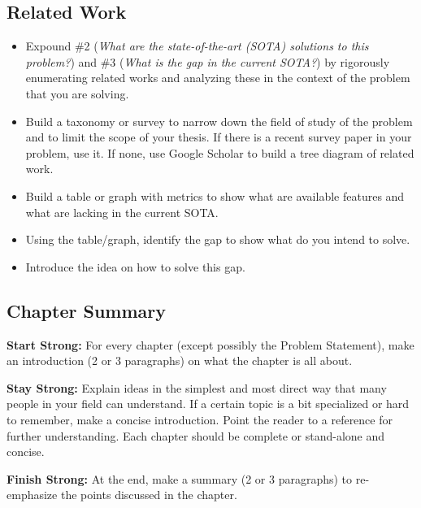 \begin{singlespace}
    \chapter{Related Work}
    \label{ch:related-work}
\end{singlespace}

\begin{itemize}
    \item Expound \#2 (\emph{What are the state-of-the-art (SOTA) solutions to this problem?}) and \#3 (\emph{What is the gap in the current SOTA?}) by rigorously enumerating related works and analyzing these in the context of the problem that you are solving.
    \item Build a taxonomy or survey to narrow down the field of study of the problem and to limit the scope of your thesis. If there is a recent survey paper in your problem, use it. If none, use Google Scholar to build a tree diagram of related work.
    \item Build a table or graph with metrics to show what are available features and what are lacking in the current SOTA.
    \item Using the table/graph, identify the gap to show what do you intend to solve.
    \item Introduce the idea on how to solve this gap.
\end{itemize}

\section{Chapter Summary}

\textbf{Start Strong:} For every chapter (except possibly the Problem Statement), make an introduction (2 or 3 paragraphs) on what the chapter is all about.

\textbf{Stay Strong:} Explain ideas in the simplest and most direct way that many people in your field can understand. If a certain topic is a bit specialized or hard to remember, make a concise introduction. Point the reader to a reference for further understanding. Each chapter should be complete or stand-alone and concise.

\textbf{Finish Strong:} At the end, make a summary (2 or 3 paragraphs) to re-emphasize the points discussed in the chapter.
